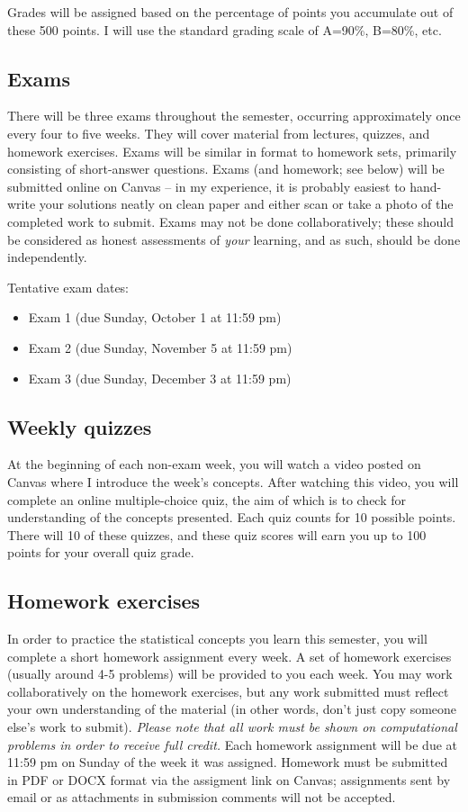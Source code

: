 \documentclass[10pt]{article}
\begin{document}
Grades will be assigned based on the percentage of points you accumulate out of these 500 points.  I will use the standard grading scale of A=90\%, B=80\%, etc.

\subsection*{Exams}
\label{sec:orgf701f63}
There will be three exams throughout the semester, occurring approximately once every four to five weeks.  They will cover material from lectures, quizzes, and homework exercises. Exams will be similar in format to homework sets, primarily consisting of short-answer questions. Exams (and homework; see below) will be submitted online on Canvas -- in my experience, it is probably easiest to hand-write your solutions neatly on clean paper and either scan or take a photo of the completed work to submit. Exams may not be done collaboratively; these should be considered as honest assessments of \emph{your} learning, and as such, should be done independently.

Tentative exam dates:

\begin{itemize}
\item Exam 1 (due Sunday, October 1 at 11:59 pm)
\item Exam 2 (due Sunday, November 5 at 11:59 pm)
\item Exam 3 (due Sunday, December 3 at 11:59 pm)
\end{itemize}

\subsection*{Weekly quizzes}
\label{sec:org9b4bbe4}

At the beginning of each non-exam week, you will watch a video posted on Canvas where I introduce the week's concepts. After watching this video, you will complete an online multiple-choice quiz, the aim of which is to check for understanding of the concepts presented. Each quiz counts for 10 possible points. There will 10 of these quizzes, and these quiz scores will earn you up to 100 points for your overall quiz grade.

\subsection*{Homework exercises}
\label{sec:org1161e9d}
In order to practice the statistical concepts you learn this semester, you will complete a short homework assignment every week. A set of homework exercises (usually around 4-5 problems) will be provided to you each week. You may work collaboratively on the homework exercises, but any work submitted must reflect your own understanding of the material (in other words, don't just copy someone else's work to submit). \emph{Please note that all work must be shown on computational problems in order to receive full credit.} Each homework assignment will be due at 11:59 pm on Sunday of the week it was assigned. Homework must be submitted in PDF or DOCX format via the assigment link on Canvas; assignments sent by email or as attachments in submission comments will not be accepted.
\end{document}
